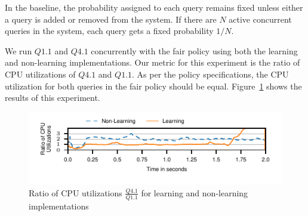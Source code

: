 In the baseline, the probability assigned to each query remains fixed unless either a query is added or removed from the system.
If there are $N$ active concurrent queries in the system, each query gets a fixed probability $1/N$.

We run $Q1.1$ and $Q4.1$ concurrently with the fair policy using both the learning and 
non-learning implementations.
Our metric for this experiment is the ratio of CPU utilizations of $Q4.1$ and $Q1.1$.
As per the policy specifications, the CPU utilization for both queries in the fair policy 
should be equal. %
Figure~\ref{fig:non-learning-comparison} shows the results of this experiment.

\begin{figure}[h]
	\centering
	\includegraphics[width=\columnwidth]{policy/figures/q1-q11-ratio-cpu-util.pdf}
	\caption{Ratio of CPU utilizations  $\frac{Q4.1}{Q1.1}$ for learning and non-learning 
		implementations}
	\label{fig:non-learning-comparison}
\end{figure}

